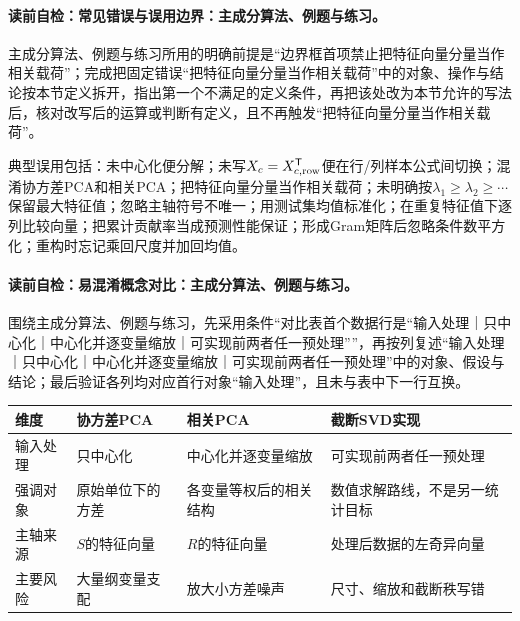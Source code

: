 \paragraph{读前自检：常见错误与误用边界：主成分算法、例题与练习。}主成分算法、例题与练习所用的明确前提是“边界框首项禁止把特征向量分量当作相关载荷”；完成把固定错误“把特征向量分量当作相关载荷”中的对象、操作与结论按本节定义拆开，指出第一个不满足的定义条件，再把该处改为本节允许的写法后，核对改写后的运算或判断有定义，且不再触发“把特征向量分量当作相关载荷”。\par

\begin{warningbox}
典型误用包括：未中心化便分解；未写$X_c=X_{c,{\rm row}}^{\mathsf T}$便在行/列样本公式间切换；混淆协方差PCA和相关PCA；把特征向量分量当作相关载荷；未明确按$\lambda_1\ge\lambda_2\ge\cdots$保留最大特征值；忽略主轴符号不唯一；用测试集均值标准化；在重复特征值下逐列比较向量；把累计贡献率当成预测性能保证；形成Gram矩阵后忽略条件数平方化；重构时忘记乘回尺度并加回均值。
\end{warningbox}

\label{struct:V4-C04-CH31}
\paragraph{读前自检：易混淆概念对比：主成分算法、例题与练习。}围绕主成分算法、例题与练习，先采用条件“对比表首个数据行是“输入处理｜只中心化｜中心化并逐变量缩放｜可实现前两者任一预处理””，再按列复述“输入处理｜只中心化｜中心化并逐变量缩放｜可实现前两者任一预处理”中的对象、假设与结论；最后验证各列均对应首行对象“输入处理”，且未与表中下一行互换。\par

\begin{comparisonbox}
\footnotesize
\renewcommand{\arraystretch}{0.92}
\begin{tabularx}{\linewidth}{@{}l X X X@{}}
\toprule 维度 & 协方差PCA & 相关PCA & 截断SVD实现\\ \midrule
输入处理 & 只中心化 & 中心化并逐变量缩放 & 可实现前两者任一预处理\\
强调对象 & 原始单位下的方差 & 各变量等权后的相关结构 & 数值求解路线，不是另一统计目标\\
主轴来源 & $S$的特征向量 & $R$的特征向量 & 处理后数据的左奇异向量\\
主要风险 & 大量纲变量支配 & 放大小方差噪声 & 尺寸、缩放和截断秩写错\\
\bottomrule
\end{tabularx}
\end{comparisonbox}


